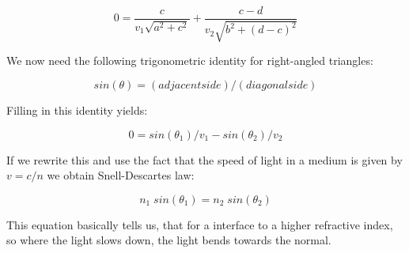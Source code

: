 \begin{equation*}
	0 = \frac{c}{v_1 \sqrt{a^2 + c^2}} + \frac{c-d}{v_2 \sqrt{b^2 + (d-c)^2}}
\end{equation*}

We now need the following trigonometric identity for right-angled triangles:
 
\begin{equation}
	sin(\theta) = (adjacent side)/(diagonal side) 
	\label{eq_sin_identity}
\end{equation}

Filling in this identity yields:

\begin{equation*}
	0 =  sin(\theta _1)/v_1 - sin(\theta _2)/v_2
\end{equation*}

If we rewrite this and use the fact that the speed of light in a medium is given by $v = c/n$ we obtain Snell-Descartes law:

\begin{equation*}
	n_1 \; sin(\theta _1) = n_2 \; sin(\theta _2)
\end{equation*}

This equation basically tells us, that for a interface to a higher refractive index, so where the light slows down, the light bends towards the normal.